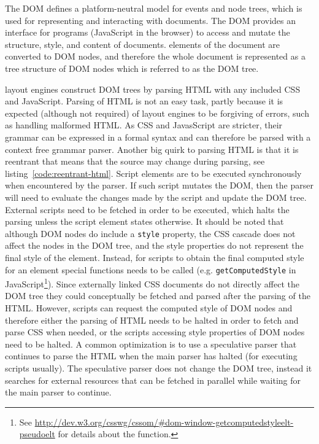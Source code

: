 \documentclass[a4paper,11pt]{kth-mag}
\newcommand{\code}[1]{\texttt{#1}}
\begin{document}
        The \gls{DOM} defines a platform-neutral model for events and node trees, which is used for representing and interacting with \glspl{document}.
        The \gls{DOM} provides an interface for programs (\gls{JavaScript} in the \gls{browser}) to access and mutate the structure, style, and content of \glspl{document}.
        \Glspl{element} of the \gls{document} are converted to \gls{DOM} nodes, and therefore the whole \gls{document} is represented as a tree structure of \gls{DOM} nodes which is referred to as the \gls{DOM} tree.

        \Glspl{layout engine} construct \gls{DOM} trees by parsing \gls{HTML} with any included \gls{CSS} and \gls{JavaScript}.
        Parsing of \gls{HTML} is not an easy task, partly because it is expected (although not required) of \glspl{layout engine} to be forgiving of errors, such as handling malformed \gls{HTML}.
        As \gls{CSS} and JavasScript are stricter, their grammar can be expressed in a formal syntax and can therefore be parsed with a context free grammar parser.
        Another big quirk to parsing \gls{HTML} is that it is reentrant that means that the source may change during parsing, see listing~\ref{code:reentrant-html}.
        Script \glspl{element} are to be executed synchronously when encountered by the parser.
        If such script mutates the \gls{DOM}, then the parser will need to evaluate the changes made by the script and update the \gls{DOM} tree.
        External scripts need to be fetched in order to be executed, which halts the parsing unless the script \gls{element} states otherwise.
        It should be noted that although \gls{DOM} nodes do include a \code{style} property, the \gls{CSS} cascade does not affect the nodes in the \gls{DOM} tree, and the style properties do not represent the final style of the \gls{element}.
        Instead, for scripts to obtain the final computed style for an \gls{element} special functions needs to be called (e.g. \code{getComputedStyle} in \gls{JavaScript}\footnote{See \url{http://dev.w3.org/csswg/cssom/\#dom-window-getcomputedstyleelt-pseudoelt} for details about the function.}).
        Since externally linked \gls{CSS} \glspl{document} do not directly affect the \gls{DOM} tree they could conceptually be fetched and parsed after the parsing of the \gls{HTML}.
        However, scripts can request the computed style of \gls{DOM} nodes and therefore either the parsing of \gls{HTML} needs to be halted in order to fetch and parse \gls{CSS} when needed, or the scripts accessing style properties of \gls{DOM} nodes need to be halted.
        A common optimization is to use a speculative parser that continues to parse the \gls{HTML} when the main parser has halted (for executing scripts usually).
        The speculative parser does not change the \gls{DOM} tree, instead it searches for external resources that can be fetched in parallel while waiting for the main parser to continue.
\end{document}
